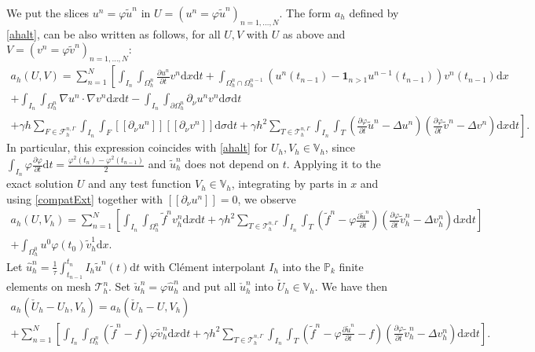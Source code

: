 \documentclass[11pt,a4paper]{article}
\theoremstyle{plain}
\theoremstyle{definition}
\theoremstyle{remark}
\numberwithin{equation}{section}
\newcommand{\dx}{\mathrm{d}x}
\newcommand{\dsigma}{\mathrm{d}\sigma}
\newcommand{\dt}{\mathrm{d}t}
\begin{document}
We put the slices $u^n = \varphi \tilde{u}^n$ in {$U=(u^n = \varphi \tilde{u}^n)_{n = 1, \ldots, N}$.}
The form $a_h$ defined by \eqref{ahalt}, can be also written as follows, for all $U, V$ with $U$ as above and $V=(v^n = \varphi \tilde{v}^n)_{n	= 1, \ldots, N}$:
\begin{multline}\label{ahgen}
	a_h (U, V) = \sum_{n = 1}^N \left[ \int_{I_n} \int_{\Omega_h^n} \frac{\partial u^n}{\partial t} v^n \dx \dt \right. +
\int_{\Omega_h^n \cap \Omega_h^{n - 1}} (u^n (t_{n - 1}) -\mathbf{1}_{n >1} u^{n - 1} (t_{n - 1})) v^n (t_{n - 1}) \dx \\
 + \int_{I_n} \int_{\Omega_h^n} %
 {\nabla u^n\cdot\nabla v^n}\dx \dt - \int_{I_n} \int_{\partial \Omega_h^n} \partial_{\nu}{u^n}v^n \dsigma \dt \\
\left. + \gamma h\sum_{F\in\mathcal{F}_h^{n, \Gamma}} \int_{I_n}  \int_{F} [\![\partial_\nu u^n]\!] [\![\partial_\nu v^n]\!] \dsigma \dt + \gamma h^2  \sum_{T\in\mathcal{T}_h^{n,\Gamma}} \int_{I_n} \int_{T} \left( \frac{\partial \varphi}{\partial t}
\tilde{u}^n - \Delta u^n \right)  \left( \frac{\partial \varphi}{\partial t}  \tilde{v}^n - \Delta v^n \right) \dx \dt\right].
\end{multline}
In particular, this expression coincides with \eqref{ahalt} for {$U_h,V_h\in\mathbb{V}_h$, since $\int_{I_n}\varphi\frac{\partial \varphi}{\partial t}\dt=\frac{\varphi^2(t_n)-\varphi^2(t_{n-1})}{2}$ and $\tilde u^n_h$ does not depend on $t$}. Applying it to the exact solution $U$ and any test function {$V_h\in\mathbb{V}_h$, integrating by parts in $x$ and using \eqref{compatExt} together with $[\![\partial_\nu u^n]\!]=0$}, we observe
\begin{multline*}
	a_h (U, V_h) = \sum_{n = 1}^N \left[ \int_{I_n} \int_{\Omega_h^n} \tilde{f}^n v_h^n \dx \dt + \gamma h^2  \sum_{T\in\mathcal{T}_h^{n,\Gamma}}\int_{I_n} \int_{T} \left( \tilde{f}^n - \varphi \frac{\partial \tilde{u}^n}{\partial t}
\right)  \left( \frac{\partial \varphi}{\partial t}  \tilde{v}_h^n - \Delta
v_h^n \right) \dx \dt \right] \\
 + \int_{\Omega_h^0} u^0 \varphi (t_0)  \tilde{v}_h^1 \dx .
\end{multline*}
Let $\hat{u}^n_h = \frac{1}{\tau}  \int_{t_{n - 1}}^{t_n} I_h  \tilde{u}^n (t)
\dt$ with {Clément} interpolant $I_h$ into the {$\mathbb{P}_k$} finite elements on mesh $\mathcal{T}_h^n$. Set $\check{u}^n_h = \varphi \hat{u}^n_h$ and put all $\check{u}^n_h$ into {$\check{U}_h\in\mathbb{V}_h$.} We have then
\begin{multline}\label{GalOrt}
	a_h (\check{U}_h   - U_h, V_h) = a_h (\check{U}_h - U, V_h) \\
 + \sum_{n = 1}^N \left[ \int_{I_n} \int_{\Omega_h^n} (\tilde{f}^n - f) \varphi \tilde{v}_h^n \dx \dt + \gamma h^2 \sum_{T\in\mathcal{T}_h^{n,\Gamma}} \int_{I_n}
\int_{T} \left( \tilde{f}^n - \varphi \frac{\partial
	\tilde{u}^n}{\partial t} - f \right)  \left( \frac{\partial \varphi}{\partial
	t}  \tilde{v}_h^n - \Delta v_h^n \right) \dx \dt \right] .
\end{multline}
\end{document}
